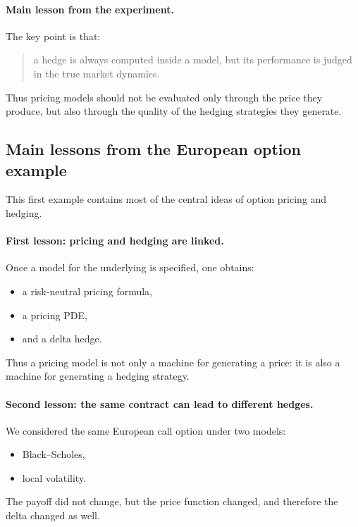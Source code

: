 \documentclass[11pt]{article}
\theoremstyle{plain}
\theoremstyle{definition}
\theoremstyle{remark}
\begin{document}
\paragraph{Main lesson from the experiment.}
The key point is that:
\begin{quote}
a hedge is always computed inside a model, but its performance is judged
in the true market dynamics.
\end{quote}

Thus pricing models should not be evaluated only through the price they
produce, but also through the quality of the hedging strategies they
generate.

\subsection{Main lessons from the European option example}

This first example contains most of the central ideas of option pricing
and hedging.

\paragraph{First lesson: pricing and hedging are linked.}
Once a model for the underlying is specified, one obtains:
\begin{itemize}[leftmargin=1.4em]
    \item a risk-neutral pricing formula,
    \item a pricing PDE,
    \item and a delta hedge.
\end{itemize}

Thus a pricing model is not only a machine for generating a price: it is
also a machine for generating a hedging strategy.

\paragraph{Second lesson: the same contract can lead to different hedges.}
We considered the same European call option under two models:
\begin{itemize}[leftmargin=1.4em]
    \item Black--Scholes,
    \item local volatility.
\end{itemize}

The payoff did not change, but the price function changed, and therefore
the delta changed as well.
\end{document}
